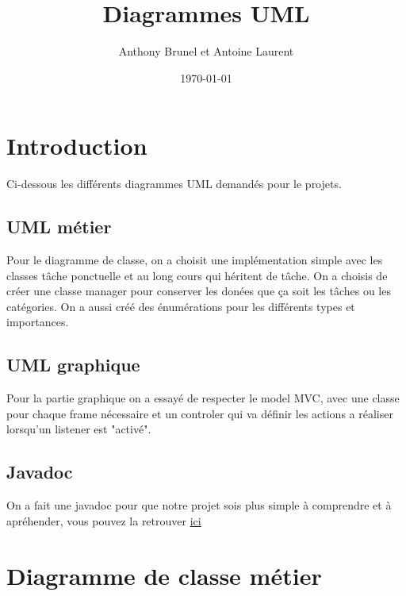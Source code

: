 \documentclass{article}
\title{Diagrammes UML}
\author{Anthony Brunel et Antoine Laurent}
\date{\today}
\begin{document}
\maketitle
\newpage
\tableofcontents
\listoffigures
\newpage

\section{Introduction}

Ci-dessous les différents diagrammes UML demandés pour le projets.

\subsection{UML métier}

Pour le diagramme de classe, on a choisit une implémentation simple avec les classes tâche ponctuelle et au long cours qui héritent de tâche. 
On a choisis de créer une classe manager pour conserver les donées que ça soit les tâches ou les catégories.
On a aussi créé des énumérations pour les différents types et importances.

\subsection{UML graphique}
Pour la partie graphique on a essayé de respecter le model MVC, avec une classe pour chaque frame nécessaire et un controler qui va définir les actions a réaliser lorsqu'un listener est "activé".

\subsection{Javadoc}

On a fait une javadoc pour que notre projet sois plus simple à comprendre et à apréhender, vous pouvez la retrouver \href{run:../doc/index.html}{ici}

\clearpage
\section{Diagramme de classe métier}
\end{document}
